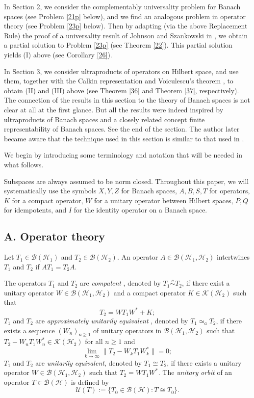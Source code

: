 \documentclass[11pt]{amsart}
\theoremstyle{definition}
\numberwithin{equation}{section}
\begin{document}
In Section 2, we consider the complementably universality problem for Banach spaces (see Problem \ref{21p} below), and we find an analogous problem in operator theory (see
Problem \ref{23p} below). Then by adapting (via the above Replacement Rule) the proof of a universality result of Johnson and Szankowski in \cite{Johnson}, we obtain a
partial solution to Problem \ref{23p} (see Theorem \ref{22}). This partial solution yields (I) above (see Corollary \ref{26}).

In Section 3, we consider ultraproducts of operators on Hilbert space, and use them, together with the Calkin representation \cite{Calkin} and Voiculescu's theorem
\cite{Voiculescu}, to obtain (II) and (III) above (see Theorem \ref{36} and Theorem \ref{37}, respectively). The connection of the results in this section to the theory of
Banach spaces is not clear at all at the first glance. But all the results were indeed inspired by ultraproducts of Banach spaces and a closely related concept finite
representability of Banach spaces. See the end of the section. The author later became aware that the technique used in this section is similar to that used in
\cite[Section 3]{Foias}.

We begin by introducing some terminology and notation that will be needed in what follows.

Subspaces are always assumed to be norm closed. Throughout this paper, we will systematically use the symbols $X,Y,Z$ for Banach spaces, $A,B,S,T$ for operators, $K$ for a
compact operator, $W$ for a unitary operator between Hilbert spaces, $P,Q$ for idempotents, and $I$ for the identity operator on a Banach space.
\subsection*{A. Operator theory}
Let $T_{1}\in\mathcal{B}(\mathcal{H}_{1})$ and $T_{2}\in\mathcal{B}(\mathcal{H}_{2})$. An operator $A\in\mathcal{B}(\mathcal{H}_{1},\mathcal{H}_{2})$ intertwines $T_{1}$
and $T_{2}$ if $AT_{1}=T_{2}A$.

The operators $T_{1}$ and $T_{2}$ are {\it compalent} \cite{Pearcy}, denoted by $T_{1}\stackrel{c}{\sim}T_{2
}$, if there exist a unitary operator $W\in\mathcal{B}(\mathcal{H}_{1},\mathcal{H}_{2})$ and a compact operator $K\in\mathcal{K}(\mathcal{H}_{2})$ such that
\[T_{2}=WT_{1}W^{*}+K;\]
$T_{1}$ and $T_{2}$ are {\it approximately unitarily equivalent} \cite{Voiculescu}, denoted by $T_{1}\simeq_{a}T_{2}$, if there exists a sequence $(W_{n})_{n\geq 1}$ of
unitary operators in $\mathcal{B}(\mathcal{H}_{1},\mathcal{H}_{2})$ such that $T_{2}-W_{n}T_{1}W_{n}^{*}\in\mathcal{K}(\mathcal{H}_{2})$ for all $n\geq 1$ and
\[\lim_{k\to\infty}\|T_{2}-W_{k}T_{1}W_{k}^{*}\|=0;\]
$T_{1}$ and $T_{2}$ are {\it unitarily equivalent}, denoted by $T_{1}\cong T_{2}$, if there exists a unitary operator $W\in\mathcal{B}(\mathcal{H}_{1}, \mathcal{H}_{2})$
such that $T_{2}=WT_{1}W^{*}$. The {\it unitary orbit} of an operator $T\in\mathcal{B(H)}$ is defined by
\[\mathcal{U}(T):=\{T_{0}\in\mathcal{B(H)}:T\cong T_{0}\}.\]
\end{document}
